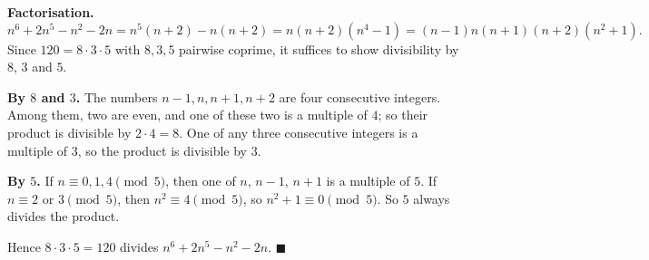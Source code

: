 \textbf{Factorisation.}
\[n^6+2n^5-n^2-2n=n^5(n+2)-n(n+2)=n(n+2)\left(n^4-1\right)=(n-1)n(n+1)(n+2)\left(n^2+1\right).\]
Since $120=8\cdot3\cdot5$ with $8,3,5$ pairwise coprime, it suffices to show divisibility by $8$, $3$ and $5$.

\textbf{By $8$ and $3$.} The numbers $n-1,n,n+1,n+2$ are four consecutive integers. Among them, two are even, and one of these two is a multiple of $4$; so their product is divisible by $2\cdot4=8$. One of any three consecutive integers is a multiple of $3$, so the product is divisible by $3$.

\textbf{By $5$.} If $n\equiv0,1,4\pmod5$, then one of $n$, $n-1$, $n+1$ is a multiple of $5$. If $n\equiv2$ or $3\pmod5$, then $n^2\equiv4\pmod5$, so $n^2+1\equiv0\pmod5$. So $5$ always divides the product.

Hence $8\cdot3\cdot5=120$ divides $n^6+2n^5-n^2-2n$. $\blacksquare$
